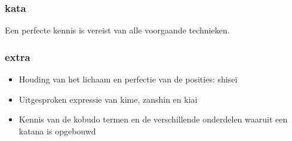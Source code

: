 \documentclass[a4paper, 12pt]{article}
\begin{document}
\begin{CJK}{UTF8}{min}
\subsubsection{kata}
\noindent Een perfecte kennis is vereist van alle voorgaande technieken.\\

\subsubsection{extra}
\begin{itemize}
\item Houding van het lichaam en perfectie van de posities: shisei
\item Uitgesproken expressie van kime, zanshin en kiai
\item Kennis van de kobudo termen en de verschillende onderdelen waaruit een katana is opgebouwd
\end{itemize}

\end{CJK}
\end{document}
